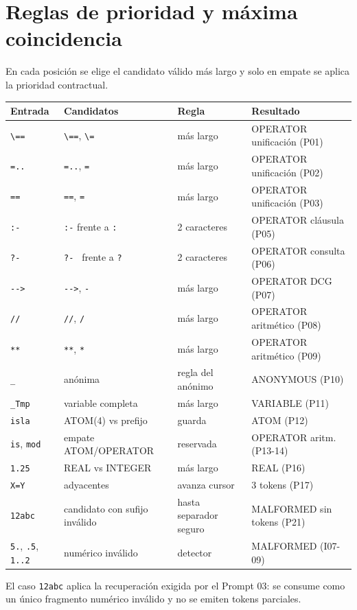 \documentclass[11pt,a4paper]{article}
\begin{document}
\section{Reglas de prioridad y máxima coincidencia}
En cada posición se elige el candidato válido más largo y solo en
empate se aplica la prioridad contractual.

{\small
\begin{longtable}{llll}
  \toprule
  Entrada & Candidatos & Regla & Resultado \\
  \midrule
  \endhead
  \verb|\==| & \verb|\==|, \verb|\=| & más largo & OPERATOR unificación (P01) \\
  \verb|=..| & \verb|=..|, \verb|=| & más largo & OPERATOR unificación (P02) \\
  \verb|==| & \verb|==|, \verb|=| & más largo & OPERATOR unificación (P03) \\
  \verb|:-| & \verb|:-| frente a \verb|:| & 2 caracteres & OPERATOR
  cláusula (P05) \\
  \verb|?- | & \verb|?- | frente a \verb|?| & 2 caracteres & OPERATOR
  consulta (P06) \\
  \verb|-->| & \verb|-->|, \verb|-| & más largo & OPERATOR DCG (P07) \\
  \verb|//| & \verb|//|, \verb|/| & más largo & OPERATOR aritmético (P08) \\
  \verb|**| & \verb|**|, \verb|*| & más largo & OPERATOR aritmético (P09) \\
  \verb|_| & anónima & regla del anónimo & ANONYMOUS (P10) \\
  \verb|_Tmp| & variable completa & más largo & VARIABLE (P11) \\
  \verb|isla| & ATOM(4) vs prefijo & guarda & ATOM (P12) \\
  \verb|is|, \verb|mod| & empate ATOM/OPERATOR & reservada & OPERATOR
  aritm. (P13-14) \\
  \verb|1.25| & REAL vs INTEGER & más largo & REAL (P16) \\
  \verb|X=Y| & adyacentes & avanza cursor & 3 tokens (P17) \\
  \verb|12abc| & candidato con sufijo inválido & hasta separador seguro &
  MALFORMED sin tokens (P21) \\
  \verb|5.|, \verb|.5|, \verb|1..2| & numérico inválido & detector &
  MALFORMED (I07-09) \\
  \bottomrule
\end{longtable}
}

El caso \verb|12abc| aplica la recuperación exigida por el Prompt 03:
se consume como un único fragmento numérico inválido y no se emiten
tokens parciales.
\end{document}

